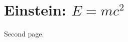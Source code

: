 \documentclass{article}
\begin{document}
\tableofcontents
\section{Einstein: \(E=mc^2\)}
\newpage
Second page.
\end{document}

